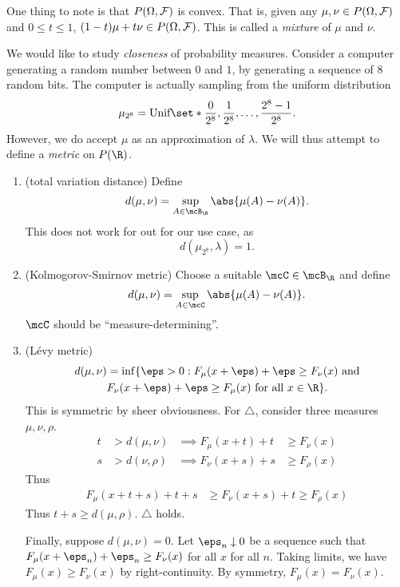 One thing to note is that $P(\Omega, \mathcal F)$ is convex.
That is, given any $\mu, \nu \in P(\Omega, \mathcal F)$ and $0 \le t \le 1$,
$(1 - t)\mu + t\nu \in P(\Omega, \mathcal F)$.
This is called a \emph{mixture} of $\mu$ and $\nu$.

We would like to study \emph{closeness} of probability measures.
Consider a computer generating a random number between $0$ and $1$,
by generating a sequence of $8$ random bits.
The computer is actually sampling from the uniform distribution \[
    \mu_{2^8} = \text{Unif} \set*{\frac{0}{2^8}, \frac{1}{2^8}, \dots,
                            \frac{2^8 - 1}{2^8}}.
\] However, we do accept $\mu$ as an approximation of $\lambda$.
We will thus attempt to define a \emph{metric} on $P(\R)$.

\begin{enumerate}[label=\textbf{Attempt \arabic*.}]
    \item (total variation distance) Define \[
        d(\mu, \nu) = \sup_{A \in \mcB_\R} \abs{\mu(A) - \nu(A)}.
    \] This does not work for out for our use case, as \[
        d(\mu_{2^8}, \lambda) = 1.
    \]
    \item (Kolmogorov-Smirnov metric) Choose a suitable $\mcC \in \mcB_\R$
    and define \[
        d(\mu, \nu) = \sup_{A \in \mcC} \abs{\mu(A) - \nu(A)}.
    \] $\mcC$ should be ``measure-determining''.
    \item (L\'evy metric)  \begin{multline*}
        d(\mu, \nu) = \inf\{\eps > 0 : F_\mu(x + \eps) + \eps \ge F_\nu(x)
            \text{ and} \\
        F_\nu(x + \eps) + \eps \ge F_\mu(x)
                            \text{ for all } x \in \R\}.
    \end{multline*}
    This is symmetric by sheer obviousness.
    For $\triangle$, consider three measures $\mu, \nu, \rho$.
    \begin{align*}
        t &> d(\mu, \nu) &\implies F_\mu(x + t) + t &\ge F_\nu(x) \\
        s &> d(\nu, \rho) &\implies F_\nu(x + s) + s &\ge F_\rho(x)
    \end{align*} Thus \begin{align*}
        F_\mu(x + t + s) + t + s &\ge F_\nu(x + s) + t \ge F_\rho(x)
    \end{align*}
    Thus $t + s \ge d(\mu, \rho)$.
    $\triangle$ holds.

    Finally, suppose $d(\mu, \nu) = 0$.
    Let $\eps_n \downarrow 0$ be a sequence such that
    $F_\mu(x + \eps_n) + \eps_n \ge F_\nu(x)$ for all $x$ for all $n$.
    Taking limits, we have $F_\mu(x) \ge F_\nu(x)$ by right-continuity.
    By symmetry, $F_\mu(x) = F_\nu(x)$.
\end{enumerate}

